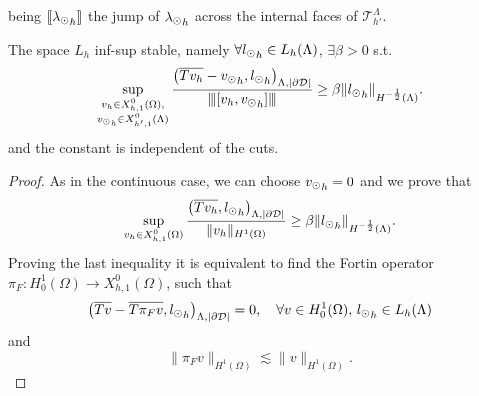 being $\llbracket {\lambda_{\odot}}_h \rrbracket$ the jump of ${\lambda_{\odot}}_h$ across the internal faces of $\mathcal{T}_{h'}^{\Lambda}$.
\begin{lemma}
The space $L_h$ inf-sup stable, namely $\forall {l_{\odot}}_h \in L_h(\Lambda)$, $\exists \beta >0$ s.t.
\begin{equation*}
\sup_{\substack{v_h \in X_{h,1}^0(\Omega),\\ {v_{\odot}}_h \in X_{h',1}^0(\Lambda)}} \frac{\left(\overline{T v_h} - {v_{\odot}}_h, {l_{\odot}} _h\right)_{\Lambda, |\partial\mathcal{D}|}}{{\left\vert\kern-0.25ex\left\vert\kern-0.25ex\left\vert [v_h, {v_{\odot}}_h] \right\vert\kern-0.25ex\right\vert\kern-0.25ex\right\vert}} \geq \beta \|{l_{\odot}}_h\|_{H^{-\frac 12}(\Lambda)}.
\end{equation*} 
and the constant is independent of the cuts. 
\end{lemma}
\begin{proof}
As in the continuous case, we can choose ${v_{\odot}}_h=0$ and we prove that
\begin{equation*} 
\sup_{v_h \in X_{h,1}^0(\Omega)} \frac{\left(\overline{T v_h} ,{l_{\odot}}_h\right)_{\Lambda, |\partial\mathcal{D}|}}{\|v_h\|_{H^1(\Omega)}} \geq \beta \|{l_{\odot}}_h\|_{H^{-\frac 12}(\Lambda)}.
\end{equation*} 
Proving the last inequality it is equivalent to find the Fortin operator $\pi_F: H^1_0(\Omega) \rightarrow X_{h,1}^0(\Omega)$, such that 
\begin{equation*}
\left(\overline{T v} - \overline{T \pi _F v}  , {l_{\odot}}_h\right)_{\Lambda, |\partial\mathcal{D}|}=0, \quad \forall v\in H^1_0(\Omega), \, {l_{\odot}}_h \in L_h(\Lambda)
\end{equation*} 
and
\begin{equation*}
\|\pi_F v\|_{H^1(\Omega)}\lesssim \|v\|_{H^1(\Omega)}.
\end{equation*} 


\end{proof}
